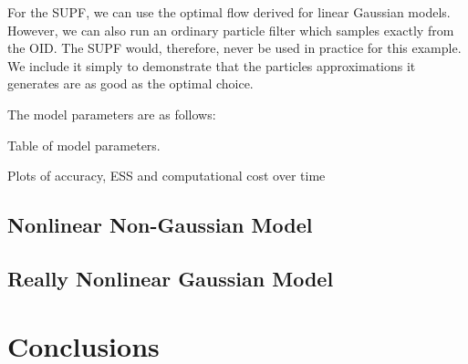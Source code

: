 \documentclass[a4paper,10pt]{article}
\begin{document}
For the SUPF, we can use the optimal flow derived for linear Gaussian models. However, we can also run an ordinary particle filter which samples exactly from the OID. The SUPF would, therefore, never be used in practice for this example. We include it simply to demonstrate that the particles approximations it generates are as good as the optimal choice.

The model parameters are as follows:

{\meta Table of model parameters.}

{\meta Plots of accuracy, ESS and computational cost over time}



\subsection{Nonlinear Non-Gaussian Model}






\subsection{Really Nonlinear Gaussian Model}

\section{Conclusions}



%
\end{document}

